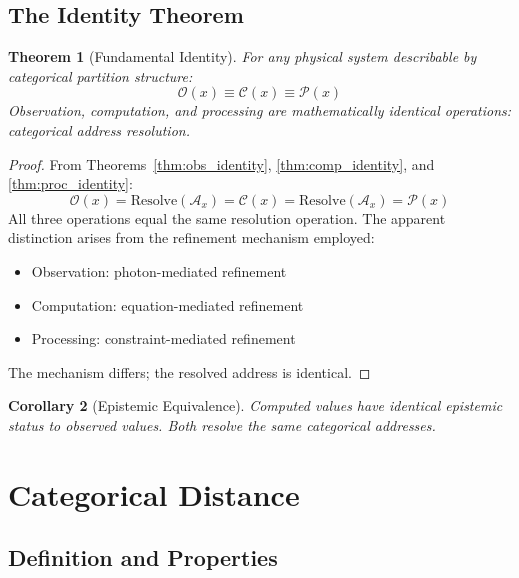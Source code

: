 \documentclass[10pt,twocolumn]{article}
\theoremstyle{plain}
\newtheorem{theorem}{Theorem}[section]
\newtheorem{corollary}[theorem]{Corollary}
\theoremstyle{definition}
\theoremstyle{remark}
\newcommand{\Obs}{\mathcal{O}}
\newcommand{\Comp}{\mathcal{C}}
\newcommand{\Proc}{\mathcal{P}}
\begin{document}
\subsection{The Identity Theorem}

\begin{theorem}[Fundamental Identity]
\label{thm:fundamental}
For any physical system describable by categorical partition structure:
\begin{equation}
\boxed{\Obs(x) \equiv \Comp(x) \equiv \Proc(x)}
\label{eq:fundamental}
\end{equation}
Observation, computation, and processing are mathematically identical operations: categorical address resolution.
\end{theorem}

\begin{proof}
From Theorems~\ref{thm:obs_identity}, \ref{thm:comp_identity}, and \ref{thm:proc_identity}:
\begin{equation}
\Obs(x) = \mathrm{Resolve}(\mathcal{A}_x) = \Comp(x) = \mathrm{Resolve}(\mathcal{A}_x) = \Proc(x)
\end{equation}
All three operations equal the same resolution operation. The apparent distinction arises from the refinement mechanism employed:
\begin{itemize}
\item Observation: photon-mediated refinement
\item Computation: equation-mediated refinement
\item Processing: constraint-mediated refinement
\end{itemize}
The mechanism differs; the resolved address is identical.
\end{proof}

\begin{corollary}[Epistemic Equivalence]
\label{cor:epistemic}
Computed values have identical epistemic status to observed values. Both resolve the same categorical addresses.
\end{corollary}

\section{Categorical Distance}
\label{sec:categorical_distance}

\subsection{Definition and Properties}
\end{document}
